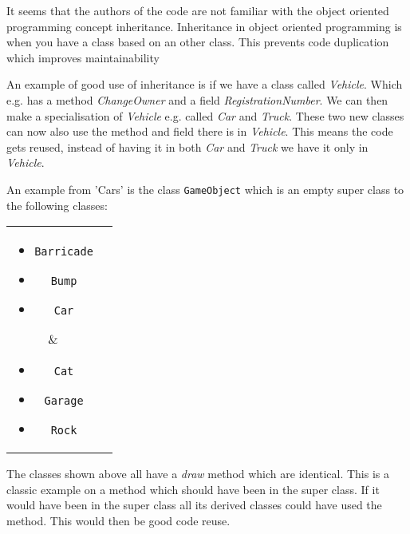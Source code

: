 It seems that the authors of the code are not familiar with the object oriented programming concept inheritance.
Inheritance in object oriented programming is when you have a class based on an other class.
This prevents code duplication which improves maintainability

An example of good use of inheritance is if we have a class called \textit{Vehicle}.
Which e.g. has a method \textit{ChangeOwner} and a field \textit{RegistrationNumber}.
We can then make a specialisation of \textit{Vehicle} e.g. called \textit{Car} and \textit{Truck}.
These two new classes can now also use the method and field there is in \textit{Vehicle}.
This means the code gets reused, instead of having it in both \textit{Car} and \textit{Truck} we have it only in \textit{Vehicle}.

An example from 'Cars' is the class \lstinline!GameObject! which is an empty super class to the following classes:

\begin{tabular}{ c  c }
\parbox{\textwidth/2}{
\begin{itemize}
\item \lstinline!Barricade!
\item \lstinline!Bump!
\item \lstinline!Car!
\end{itemize}} &
\parbox{\textwidth/2}{
\begin{itemize}
\item \lstinline!Cat!
\item \lstinline!Garage!
\item \lstinline!Rock!
\end{itemize}
}
\end{tabular}
The classes shown above all have a \textit{draw} method which are identical.
This is a classic example on a method which should have been in the super class.
If it would have been in the super class all its derived classes could have used the method.
This would then be good code reuse.